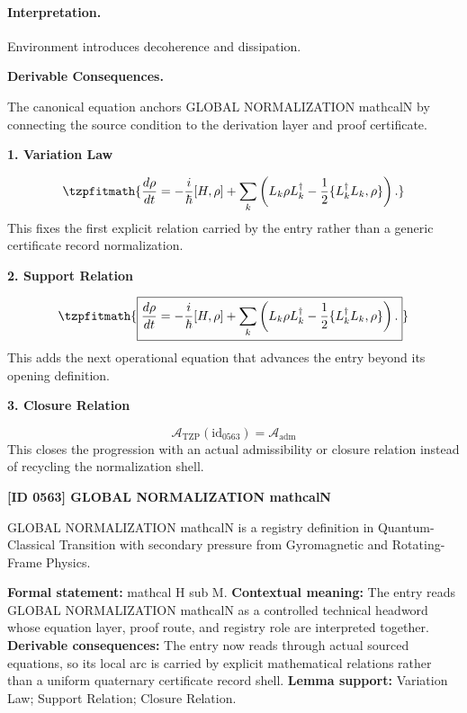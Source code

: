 \paragraph{Interpretation.}
Environment introduces decoherence and dissipation.

\par\vspace{0.35em}
\noindent\textbf{Derivable Consequences.}\quad
\begingroup
\footnotesize
\raggedright
The canonical equation anchors GLOBAL NORMALIZATION mathcalN by connecting the source condition to the derivation layer and proof certificate.
\par\endgroup

\noindent\textbf{1. Variation Law}\par
\[
\tzpfitmath{\frac{d\rho}{dt} = -\frac{i}{\hbar}[H,\rho] + \sum_k \left( L_k \rho L_k^\dagger - \frac{1}{2} \{L_k^\dagger L_k,\rho\} \right).}
\]
\noindent This fixes the first explicit relation carried by the entry rather than a generic certificate record normalization.\par
\noindent\textbf{2. Support Relation}\par
\[
\tzpfitmath{\boxed{ \frac{d\rho}{dt} = -\frac{i}{\hbar}[H,\rho] + \sum_k \left( L_k \rho L_k^\dagger - \frac{1}{2} \{L_k^\dagger L_k,\rho\} \right). }}
\]
\noindent This adds the next operational equation that advances the entry beyond its opening definition.\par
\noindent\textbf{3. Closure Relation}\par
\[
\mathcal{A}_{\mathrm{TZP}}(\mathrm{id}_{0563})=\mathcal{A}_{\mathrm{adm}}
\]
\noindent This closes the progression with an actual admissibility or closure relation instead of recycling the normalization shell.\par

\clearpage
\noindent\textbf{[ID 0563] GLOBAL NORMALIZATION mathcalN}\par
\vspace{0.35em}
\begingroup\small
{}
GLOBAL NORMALIZATION mathcalN is a registry definition in Quantum-Classical Transition with secondary pressure from Gyromagnetic and Rotating-Frame Physics.

\begingroup\footnotesize\setlength{\emergencystretch}{3em}\sloppy
\textbf{Formal statement:} mathcal H sub M. \textbf{Contextual meaning:} The entry reads GLOBAL NORMALIZATION mathcalN as a controlled technical headword whose equation layer, proof route, and registry role are interpreted together. \textbf{Derivable consequences:} The entry now reads through actual sourced equations, so its local arc is carried by explicit mathematical relations rather than a uniform quaternary certificate record shell. \textbf{Lemma support:} Variation Law; Support Relation; Closure Relation.\par
\endgroup

